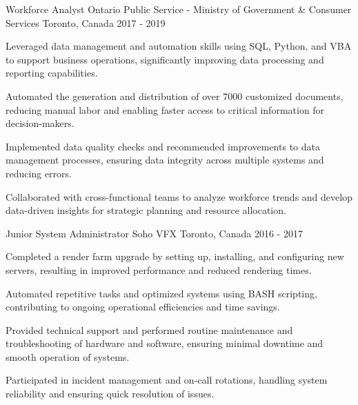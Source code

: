 \begin{cventries}
\cventry
  {Workforce Analyst}
  {Ontario Public Service - Ministry of Government \& Consumer Services}
  {Toronto, Canada}
  {2017 - 2019}
  {
    \begin{cvitems}
      \item Leveraged data management and automation skills using SQL, Python, and VBA to support business operations, significantly improving data processing and reporting capabilities.
      \item Automated the generation and distribution of over 7000 customized documents, reducing manual labor and enabling faster access to critical information for decision-makers.
      \item Implemented data quality checks and recommended improvements to data management processes, ensuring data integrity across multiple systems and reducing errors.
      \item Collaborated with cross-functional teams to analyze workforce trends and develop data-driven insights for strategic planning and resource allocation.
    \end{cvitems}
  }

\cventry
  {Junior System Administrator}
  {Soho VFX}
  {Toronto, Canada}
  {2016 - 2017}
  {
    \begin{cvitems}
      \item Completed a render farm upgrade by setting up, installing, and configuring new servers, resulting in improved performance and reduced rendering times.
      \item Automated repetitive tasks and optimized systems using BASH scripting, contributing to ongoing operational efficiencies and time savings.
      \item Provided technical support and performed routine maintenance and troubleshooting of hardware and software, ensuring minimal downtime and smooth operation of systems.
      \item Participated in incident management and on-call rotations, handling system reliability and ensuring quick resolution of issues.
    \end{cvitems}
  }


\end{cventries}
